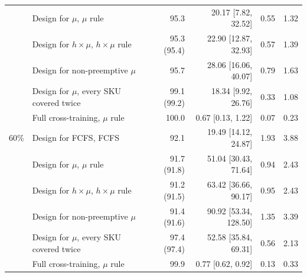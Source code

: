 \begin{table}[!htb]
\begin{tabular}{@{}cl r rr r@{}}
 & Design for $\mu$, $\mu$ rule & 95.3 & 20.17 [7.82, 32.52] & 0.55 & 1.32 \\
 & Design for $h\times\mu$, $h\times\mu$ rule & 95.3 (95.4) & 22.90 [12.87, 32.93] & 0.57 & 1.39 \\
 & Design for non-preemptive $\mu$ & 95.7 & 28.06 [16.06, 40.07] & 0.79 & 1.63 \\
 & Design for $\mu$, every SKU covered twice & 99.1 (99.2) & 18.34 [9.92, 26.76] & 0.33 & 1.08 \\
 & Full cross-training, $\mu$ rule & 100.0 & 0.67 [0.13, 1.22] & 0.07 & 0.23 \\
\midrule
60\% & Design for FCFS, FCFS & 92.1 & 19.49 [14.12, 24.87] & 1.93 & 3.88 \\
 & Design for $\mu$, $\mu$ rule & 91.7 (91.8) & 51.04 [30.43, 71.64] & 0.94 & 2.43 \\
 & Design for $h\times\mu$, $h\times\mu$ rule & 91.2 (91.5) & 63.42 [36.66, 90.17] & 0.95 & 2.43 \\
 & Design for non-preemptive $\mu$ & 91.4 (91.6) & 90.92 [53.34, 128.50] & 1.35 & 3.39 \\
 & Design for $\mu$, every SKU covered twice & 97.4 (97.4) & 52.58 [35.84, 69.31] & 0.56 & 2.13 \\
 & Full cross-training, $\mu$ rule & 99.9 & 0.77 [0.62, 0.92] & 0.13 & 0.33 \\
\bottomrule
\end{tabular}
\end{table}
